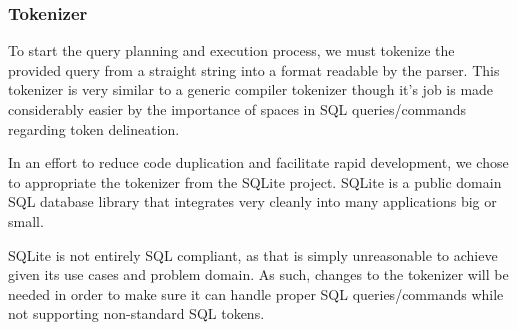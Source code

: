 \documentclass[letterpaper, 12pt]{article}
\begin{document}

\subsubsection{Tokenizer}
To start the query planning and execution process, we must tokenize the provided query
from a straight string into a format readable by the parser. This tokenizer is very
similar to a generic compiler tokenizer though it's job is made considerably easier 
by the importance of spaces in SQL queries/commands regarding token delineation.
\par\vspace{\baselineskip}
In an effort to reduce code duplication and facilitate rapid development, we chose
to appropriate the tokenizer from the SQLite project. SQLite is a public domain
SQL database library that integrates very cleanly into many applications big
or small.
\par\vspace{\baselineskip}
SQLite is not entirely SQL compliant, as that is simply unreasonable to achieve
given its use cases and problem domain. As such, changes to the tokenizer will be
needed in order to make sure it can handle proper SQL queries/commands while 
not supporting non-standard SQL tokens.
\end{document}
